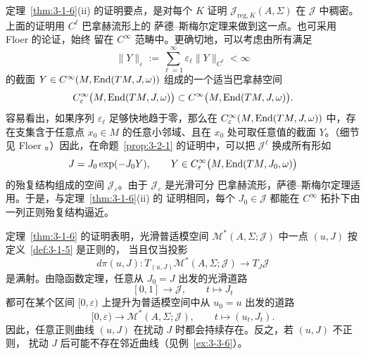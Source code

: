 \begin{remark}\label{rem:3-2-7}
定理~\ref{thm:3-1-6}\textup{(ii)} 的证明要点，是对每个 $K$ 证明
$\mathcal J_{\mathrm{reg},K}(A,\Sigma)$ 在 $\mathcal J$ 中稠密。上面的证明用
$C^\ell$ 巴拿赫流形上的 萨德--斯梅尔定理来做到这一点。也可采用 Floer 的论证，始终
留在 $C^\infty$ 范畴中。更确切地，可以考虑由所有满足
\[
  \|Y\|_\varepsilon
  :=\sum_{\ell=1}^\infty
  \varepsilon_\ell\|Y\|_{C^\ell}<\infty
\]
的截面 $Y\in C^\infty(M,\operatorname{End}(TM,J,\omega))$ 组成的一个适当巴拿赫空间
\[
  C_\varepsilon^\infty\bigl(M,\operatorname{End}(TM,J,\omega)\bigr)
  \subset C^\infty\bigl(M,\operatorname{End}(TM,J,\omega)\bigr).
\]
容易看出，如果序列 $\varepsilon_\ell$ 足够快地趋于零，那么在
$C_\varepsilon^\infty(M,\operatorname{End}(TM,J,\omega))$ 中，存在支集含于任意点
$x_0\in M$ 的任意小邻域、且在 $x_0$ 处可取任意值的截面 $Y$。（细节见 Floer
。）因此，在命题~\ref{prop:3-2-1} 的证明中，可以把 $\mathcal J^\ell$
换成所有形如
\[
  J=J_0\exp(-J_0Y),
  \qquad
  Y\in C_\varepsilon^\infty
  \bigl(M,\operatorname{End}(TM,J_0,\omega)\bigr)
\]
的殆复结构组成的空间 $\mathcal J_\varepsilon$。由于 $\mathcal J_\varepsilon$ 是光滑可分
巴拿赫流形，萨德--斯梅尔定理适用。于是，与定理~\ref{thm:3-1-6}\textup{(ii)} 的
证明相同，每个 $J_0\in\mathcal J$ 都能在 $C^\infty$ 拓扑下由一列正则殆复结构逼近。
\end{remark}

\begin{remark}\label{rem:3-2-8}
定理~\ref{thm:3-1-6} 的证明表明，光滑普适模空间
$\mathcal M^*(A,\Sigma;\mathcal J)$ 中一点 $(u,J)$ 按定义~\ref{def:3-1-5} 是正则的，
当且仅当投影
\[
  d\pi(u,J):T_{(u,J)}\mathcal M^*(A,\Sigma;\mathcal J)
  \longrightarrow T_J\mathcal J
\]
是满射。由隐函数定理，任意从 $J_0=J$ 出发的光滑道路
\[
  [0,1]\longrightarrow\mathcal J,
  \qquad t\longmapsto J_t
\]
都可在某个区间 $[0,\varepsilon)$ 上提升为普适模空间中从 $u_0=u$ 出发的道路
\[
  [0,\varepsilon)\longrightarrow
  \mathcal M^*(A,\Sigma;\mathcal J),
  \qquad t\longmapsto(u_t,J_t).
\]
因此，任意正则曲线 $(u,J)$ 在扰动 $J$ 时都会持续存在。反之，若 $(u,J)$ 不正则，
扰动 $J$ 后可能不存在邻近曲线（见例~\ref{ex:3-3-6}）。
\end{remark}
